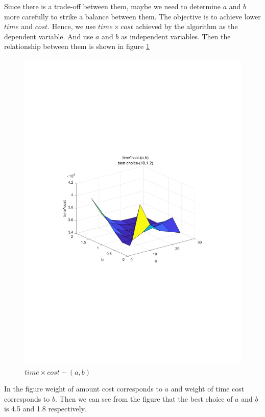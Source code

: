 \documentclass[11pt, a4paper]{article} %
\begin{document}
	Since there is a trade-off between them, maybe we need to determine $a$ and $b$ more carefully to strike a balance between them. The objective is to achieve lower $time$ and $cost$. Hence, we use $time\times cost$ achieved by the algorithm as the dependent variable. And use $a$ and $b$ as independent variables. Then the relationship between them is shown in figure \ref{fig:ab}
	\begin{figure}
		\centering
		
		\includegraphics[width=\textwidth]{figure/ab}
		\caption{$time\times cost-(a,b)$}
		\label{fig:ab}
	\end{figure}

	In the figure weight of amount cost corresponds to $a$ and weight of time cost corresponds to $b$. Then we can see from the figure that the best choice of $a$ and $b$ is 4.5 and 1.8 respectively.
\end{document}
